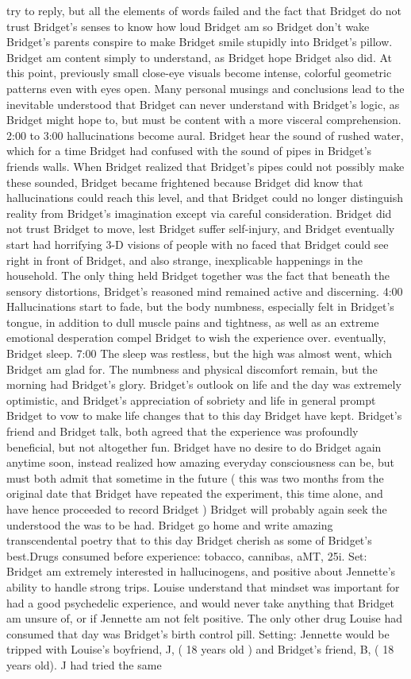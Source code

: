 \documentclass[12pt]{book}
\begin{document}
try to reply, but all the elements of words failed and the fact that Bridget do not trust Bridget's senses to know how loud Bridget am so Bridget don't wake Bridget's parents conspire to make Bridget smile stupidly into Bridget's pillow. Bridget am content simply to understand, as Bridget hope Bridget also did. At this point, previously small close-eye visuals become intense, colorful geometric patterns even with eyes open. Many personal musings and conclusions lead to the inevitable understood that Bridget can never understand with Bridget's logic, as Bridget might hope to, but must be content with a more visceral comprehension. 2:00 to 3:00 hallucinations become aural. Bridget hear the sound of rushed water, which for a time Bridget had confused with the sound of pipes in Bridget's friends walls. When Bridget realized that Bridget's pipes could not possibly make these sounded, Bridget became frightened because Bridget did know that hallucinations could reach this level, and that Bridget could no longer distinguish reality from Bridget's imagination except via careful consideration. Bridget did not trust Bridget to move, lest Bridget suffer self-injury, and Bridget eventually start had horrifying 3-D visions of people with no faced that Bridget could see right in front of Bridget, and also strange, inexplicable happenings in the household. The only thing held Bridget together was the fact that beneath the sensory distortions, Bridget's reasoned mind remained active and discerning. 4:00 Hallucinations start to fade, but the body numbness, especially felt in Bridget's tongue, in addition to dull muscle pains and tightness, as well as an extreme emotional desperation compel Bridget to wish the experience over. eventually, Bridget sleep. 7:00 The sleep was restless, but the high was almost went, which Bridget am glad for. The numbness and physical discomfort remain, but the morning had Bridget's glory. Bridget's outlook on life and the day was extremely optimistic, and Bridget's appreciation of sobriety and life in general prompt Bridget to vow to make life changes that to this day Bridget have kept. Bridget's friend and Bridget talk, both agreed that the experience was profoundly beneficial, but not altogether fun. Bridget have no desire to do Bridget again anytime soon, instead realized how amazing everyday consciousness can be, but must both admit that sometime in the future ( this was two months from the original date that Bridget have repeated the experiment, this time alone, and have hence proceeded to record Bridget ) Bridget will probably again seek the understood the was to be had. Bridget go home and write amazing transcendental poetry that to this day Bridget cherish as some of Bridget's best.Drugs consumed before experience: tobacco, cannibas, aMT, 25i. Set: Bridget am extremely interested in hallucinogens, and positive about Jennette's ability to handle strong trips. Louise understand that mindset was important for had a good psychedelic experience, and would never take anything that Bridget am unsure of, or if Jennette am not felt positive. The only other drug Louise had consumed that day was Bridget's birth control pill. Setting: Jennette would be tripped with Louise's boyfriend, J, ( 18 years old ) and Bridget's friend, B, ( 18 years old). J had tried the same 
\end{document}
